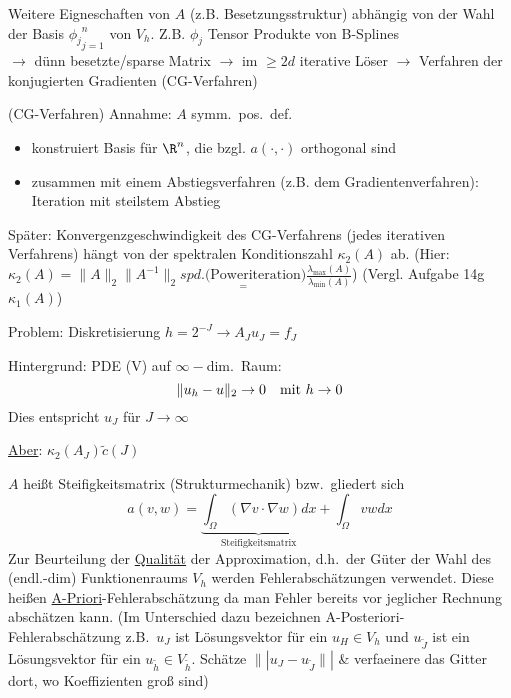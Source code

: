Weitere Eigneschaften von $A$ (z.B. Besetzungsstruktur) abhängig von der Wahl der Basis ${\phi_j}_{j=1}^n$ von $V_h$. Z.B. ${\phi_j}$ Tensor Produkte von B-Splines\\
$\to$ dünn besetzte/sparse Matrix
$\to$ im $\geq 2d$ iterative Löser $\to$ Verfahren der konjugierten Gradienten (CG-Verfahren)

\begin{beispiel} (CG-Verfahren)
    Annahme: $A$ symm.\ pos.\ def.\
    \begin{itemize}
        \item konstruiert Basis für $\R^n$, die bzgl. $a(\cdot,\cdot)$ orthogonal sind
        \item zusammen mit einem Abstiegsverfahren (z.B. dem Gradientenverfahren): Iteration mit steilstem Abstieg
    \end{itemize}
\end{beispiel}

Später: Konvergenzgeschwindigkeit des CG-Verfahrens (jedes iterativen Verfahrens) hängt von der spektralen Konditionszahl $\kappa_2(A)$ ab. (Hier: $\kappa_2(A) = \|A\|_2\|A^{-1}\|_2 \underset{=}{spd. \text{(Poweriteration)}} \frac{\lambda_{\max}(A)}{\lambda_{\min}(A)}$) (Vergl. Aufgabe 14g $\kappa_1(A)$)

Problem: Diskretisierung $h=2^{-J} \to A_J u_J = f_J$

\begin{beispiel}
    Hintergrund: PDE (V) auf $\infty-$dim.\ Raum:
    \[
        \|u_h -u\|_2 \to 0 \quad \text{mit } h\to 0\\ 
    \]
    Dies entspricht $u_J$ für $J\to\infty$
\end{beispiel}
\underline{Aber}: $\kappa_2(A_J) \tilde c(J)$

$A$ heißt Steifigkeitsmatrix (Strukturmechanik) bzw.\ gliedert sich 
\[
    a(v,w) = \underbrace{\int_{\Omega} (\nabla v \cdot \nabla w) dx}_{\text{Steifigkeitsmatrix}} + \int_{\Omega}vw dx
\]
Zur Beurteilung der \underline{Qualität} der Approximation, d.h.\ der Güter der Wahl des (endl.-dim) Funktionenraums $V_h$ werden Fehlerabschätzungen verwendet. Diese heißen \underline{A-Priori}-Fehlerabschätzung da man Fehler bereits vor jeglicher Rechnung abschätzen kann.
(Im Unterschied dazu bezeichnen A-Posteriori-Fehlerabschätzung z.B.\ $u_J$ ist Lösungsvektor für ein $u_H\in V_h$ und $u_{\tilde{J}}$ ist ein Lösungsvektor für ein $u_{\tilde{h}}\in V_{\tilde{h}}$. Schätze $\||u_J - u_{\tilde{J}}\||$ \& verfaeinere das Gitter dort, wo Koeffizienten groß sind)\\


